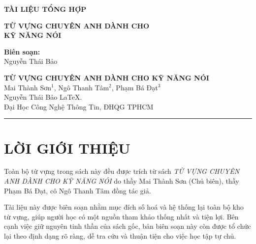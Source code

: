 \documentclass[a4paper,12pt]{article}
\begin{document}
\begin{titlepage}
   
\begin{center}
\textbf{\LARGE TÀI LIỆU TỔNG HỢP}\\[0.5cm] \vspace{20pt}

\vfill

\textbf{\LARGE  TỪ VỰNG CHUYÊN ANH DÀNH CHO\\ KỸ NĂNG NÓI}\\

\vfill

\textbf {\large Biên soạn:}\\[0.2cm]
\Large {Nguyễn Thái Bảo}\\[0.1cm]
\end{center}

\end{titlepage}

\begin{center}
    
    \large \textbf{TỪ VỰNG CHUYÊN ANH DÀNH CHO KỸ NĂNG NÓI}\\
    \vspace{2mm}
    Mai Thành Sơn$^{1}$, Ngô Thanh Tâm$^{2}$, Phạm Bá Đạt$^{3}$\\
    \vspace{7.5mm}
    Nguyễn Thái Bảo \LaTeX.\\ Đại Học Công Nghệ Thông Tin, ĐHQG TPHCM  

        \begin{center}
		    \textcolor{azul}{\rule{170mm}{0.5mm}}
	    \end{center}	
\end{center}

\section*{LỜI GIỚI THIỆU}
\thispagestyle{empty}
\noindent
Toàn bộ từ vựng trong sách này đều được trích từ sách \emph{TỪ VỰNG CHUYÊN ANH DÀNH CHO KỸ NĂNG NÓI} do thầy Mai Thành Sơn (Chủ biên), thầy Phạm Bá Đạt, cô Ngô Thanh Tâm đồng tác giả.

\vspace{3mm}
\noindent
Tài liệu này được biên soạn nhằm mục đích số hoá và hệ thống lại toàn bộ kho từ vựng,
giúp người học có một nguồn tham khảo thống nhất và tiện lợi. 
Bên cạnh việc giữ nguyên tinh thần của sách gốc, bản biên soạn này còn được 
tổ chức lại theo định dạng rõ ràng, dễ tra cứu và thuận tiện cho việc học tập tự chủ.
\end{document}
